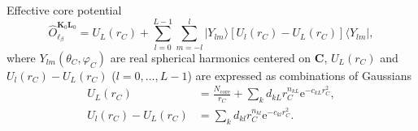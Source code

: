 \documentclass[a4paper,11pt,twoside,openright]{book}
\begin{document}
Effective core potential
\begin{equation}
  \label{eq:ecp-op1}
  \hat{O}_{\ell_{\beta}}^{\boldsymbol{K}_{0}\boldsymbol{L}_{0}}
  =U_{L}(r_C)+\sum_{l=0}^{L-1}\sum_{m=-l}^{l}|Y_{lm}\rangle[U_l(r_C)-U_{L}(r_C)]\langle Y_{lm}|,
\end{equation}
where $Y_{lm}(\theta_C,\varphi_C)$ are real spherical harmonics centered on $\boldsymbol{C}$,
$U_L(r_C)$ and $U_l(r_C)-U_{L}(r_C)$ ($l=0,\dots,L-1$) are expressed as combinations of Gaussians
\begin{align}
  U_L(r_C)&=\frac{N_\text{core}}{r_C}+\sum_{k}d_{kL}r_{C}^{n_{kL}}\mathrm{e}^{-c_{kL}r_{C}^{2}},\\
  U_l(r_C)-U_L(r_C)&=\sum_{k}d_{kl}r_{C}^{n_{kl}}\mathrm{e}^{-c_{kl}r_{C}^{2}}.  
\end{align}
\end{document}
